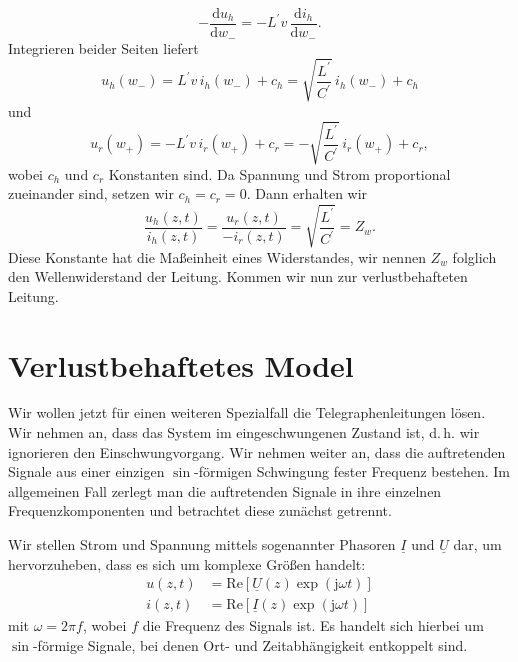 \documentclass[paper=a4, parskip=half-, ngerman, fontsize=11pt]{scrreprt}
\begin{document}
\begin{equation*}
    - \frac{\text{d} u_{h}}{\text{d} w_{-}} = - L^{\prime} v \, \frac{\text{d} i_{h}}{\text{d} w_{-}}.
\end{equation*}
Integrieren beider Seiten liefert
\begin{equation*}
    u_{h}(w_{-}) = L^{\prime} v \, i_{h}(w_{-}) + c_{h} = \sqrt{\frac{L^{\prime}}{C^{\prime}}} \, i_{h}(w_{-}) +
    c_{h}
\end{equation*}
und
\begin{equation*}
    u_{r}(w_{+}) = - L^{\prime} v \, i_{r}(w_{+}) + c_{r} = - \sqrt{\frac{L^{\prime}}{C^{\prime}}} \, i_{r}(w_{+}) +
    c_{r},
\end{equation*}
wobei $c_{h}$ und $c_{r}$ Konstanten sind. Da Spannung und Strom proportional zueinander sind, setzen wir
\mbox{$c_{h} = c_{r} = 0$}. Dann erhalten wir
\begin{equation*}
    \frac{u_{h}(z, t)}{i_{h}(z, t)} = \frac{u_{r}(z, t)}{- i_{r}(z, t)} = \sqrt{\frac{L^{\prime}}{C^{\prime}}} = Z_{w}.
\end{equation*}
Diese Konstante hat die Maßeinheit eines Widerstandes, wir nennen $Z_{w}$ folglich den Wellenwiderstand der Leitung.
Kommen wir nun zur verlustbehafteten Leitung.

\section{Verlustbehaftetes Model}
Wir wollen jetzt für einen weiteren Spezialfall die Telegraphenleitungen lösen. Wir nehmen an, dass das System im
eingeschwungenen Zustand ist, d.\,h. wir ignorieren den Einschwungvorgang. Wir nehmen weiter an, dass die auftretenden
Signale aus einer einzigen $\sin$-förmigen Schwingung fester Frequenz bestehen. Im allgemeinen Fall zerlegt man die
auftretenden Signale in ihre einzelnen Frequenzkomponenten und betrachtet diese zunächst getrennt.

Wir stellen Strom und Spannung mittels sogenannter Phasoren $\underline{I}$ und $\underline{U}$ dar, um hervorzuheben,
dass es sich um komplexe Größen handelt:
\begin{align}
    u(z, t) &= \mathrm{Re} \left[ \underline{U}(z) \exp(\mathrm{j} \omega t) \right] \label{eq:Spannung} \\
    i(z, t) &= \mathrm{Re} \left[ \underline{I}(z) \exp(\mathrm{j} \omega t) \right]
\end{align}
mit $\omega = 2 \pi f$, wobei $f$ die Frequenz des Signals ist. Es handelt sich hierbei um $\sin$-förmige Signale, bei
denen Ort- und Zeitabhängigkeit entkoppelt sind.
\end{document}
